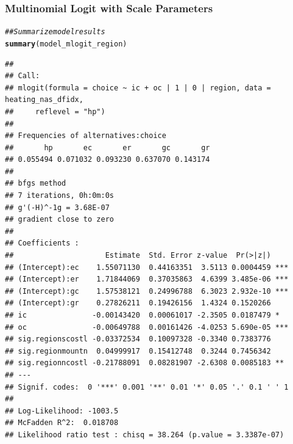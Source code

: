 \documentclass{beamer}\usepackage[]{graphicx}\usepackage[]{color}
\makeatletter
\newcommand{\hlcom}[1]{\textcolor[rgb]{0.678,0.584,0.686}{\textit{#1}}}%
\newcommand{\hlstd}[1]{\textcolor[rgb]{0.345,0.345,0.345}{#1}}%
\newcommand{\hlkwd}[1]{\textcolor[rgb]{0.737,0.353,0.396}{\textbf{#1}}}%
\newenvironment{kframe}{%
 \def\at@end@of@kframe{}%
 \ifinner\ifhmode%
  \def\at@end@of@kframe{\end{minipage}}%
  \begin{minipage}{\columnwidth}%
 \fi\fi%
 \def\FrameCommand##1{\hskip\@totalleftmargin \hskip-\fboxsep
 \colorbox{shadecolor}{##1}\hskip-\fboxsep
     \hskip-\linewidth \hskip-\@totalleftmargin \hskip\columnwidth}%
 \MakeFramed {\advance\hsize-\width
   \@totalleftmargin\z@ \linewidth\hsize
   \@setminipage}}%
 {\par\unskip\endMakeFramed%
 \at@end@of@kframe}
\newenvironment{knitrout}{}{} %
\makeatother
\begin{document}
\begin{frame}[fragile]\frametitle{Multinomial Logit with Scale Parameters}
    \vspace{0.5ex}
\begin{knitrout}\tiny
{}\color{fgcolor}\begin{kframe}
\begin{alltt}
\hlcom{## Summarize model results}
\hlkwd{summary}\hlstd{(model_mlogit_region)}
\end{alltt}
\begin{verbatim}
## 
## Call:
## mlogit(formula = choice ~ ic + oc | 1 | 0 | region, data = heating_nas_dfidx, 
##     reflevel = "hp")
## 
## Frequencies of alternatives:choice
##       hp       ec       er       gc       gr 
## 0.055494 0.071032 0.093230 0.637070 0.143174 
## 
## bfgs method
## 7 iterations, 0h:0m:0s 
## g'(-H)^-1g = 3.68E-07 
## gradient close to zero 
## 
## Coefficients :
##                     Estimate  Std. Error z-value  Pr(>|z|)    
## (Intercept):ec    1.55071130  0.44163351  3.5113 0.0004459 ***
## (Intercept):er    1.71844069  0.37035863  4.6399 3.485e-06 ***
## (Intercept):gc    1.57538121  0.24996788  6.3023 2.932e-10 ***
## (Intercept):gr    0.27826211  0.19426156  1.4324 0.1520266    
## ic               -0.00143420  0.00061017 -2.3505 0.0187479 *  
## oc               -0.00649788  0.00161426 -4.0253 5.690e-05 ***
## sig.regionscostl -0.03372534  0.10097328 -0.3340 0.7383776    
## sig.regionmountn  0.04999917  0.15412748  0.3244 0.7456342    
## sig.regionncostl -0.21788091  0.08281907 -2.6308 0.0085183 ** 
## ---
## Signif. codes:  0 '***' 0.001 '**' 0.01 '*' 0.05 '.' 0.1 ' ' 1
## 
## Log-Likelihood: -1003.5
## McFadden R^2:  0.018708 
## Likelihood ratio test : chisq = 38.264 (p.value = 3.3387e-07)
\end{verbatim}
\end{kframe}
\end{knitrout}
\end{frame}
\end{document}

